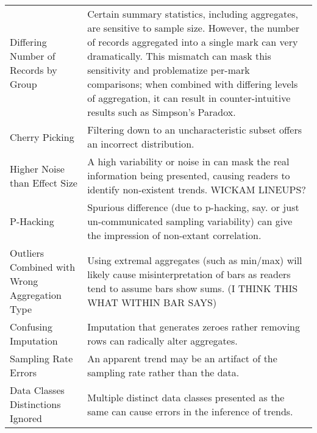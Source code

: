 \begin{table*}[]
\begin{tabular}{p{5cm}p{12cm}}
   \rowcolor{colorb}\multirow{8}{0em}{\hspace{-0.6cm}\rotatebox{90}{\normalsize{Wrangling}}}Differing Number of Records by Group  & Certain summary statistics, including aggregates, are sensitive to sample size. However, the number of records aggregated into a single mark can very dramatically. This mismatch can mask this sensitivity and problematize per-mark comparisons; when combined with differing levels of aggregation, it can result in counter-intuitive results such as Simpson's Paradox. \cite{guo2017you}\\
 \rowcolor{colorb-opaque}Cherry Picking & Filtering down to an uncharacteristic subset offers an incorrect distribution. \cite{few2019loom}\\
 \rowcolor{colorb}Higher Noise than Effect Size & A high variability or noise in can mask the real information being presented, causing readers to identify non-existent trends. WICKAM LINEUPS?\\
 \rowcolor{colorb-opaque}P-Hacking & Spurious difference (due to p-hacking, say. or just un-communicated sampling variability) can give the impression of non-extant correlation. \cite{pu2018garden}\\
 \rowcolor{colorb}Outliers Combined with Wrong Aggregation Type & Using extremal aggregates (such as min/max) will likely cause misinterpretation of bars as readers tend to assume bars show sums. (I THINK THIS WHAT WITHIN BAR SAYS) \cite{newman2012bar}\\
 \rowcolor{colorb-opaque}Confusing Imputation & Imputation that generates zeroes rather removing rows can radically alter aggregates. \cite{song2018s}\\
 \rowcolor{colorb}Sampling Rate Errors  & An apparent trend may be an artifact of the sampling rate rather than the data. \cite{kindlmann2014algebraic}\\
 \rowcolor{colorb-opaque}Data Classes Distinctions Ignored & Multiple distinct data classes presented as the same can cause errors in the inference of trends. \cite{anand2015automatic}\\


\end{tabular}
\end{table*}

